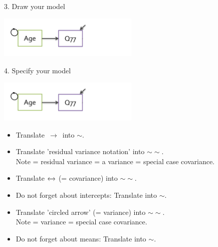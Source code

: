 \documentclass[10pt]{beamer}\usepackage[]{graphicx}\usepackage[]{xcolor}
\begin{document}
%
\begin{frame}[fragile]{3. Draw your model}

\includegraphics[height=2cm, keepaspectratio=T] {RegressionModel.png}

\end{frame}
%
\begin{frame}[fragile]{4. Specify your model}

\includegraphics[height=2cm, keepaspectratio=T] {RegressionModel.png}

\begin{itemize}
  \item Translate $\,\to\,$ into $\sim$.
  \item Translate 'residual variance notation' into $\sim\sim$.\\
  Note = residual variance = a variance = special case covariance.
  \item Translate $\xleftrightarrow{}$ (= covariance) into $\sim\sim$.
  \item Do not forget about intercepts: Translate into $\sim$.
  
  \vspace{5mm}
  
  \item Translate 'circled arrow' (= variance) into $\sim\sim$.\\
  Note = variance = special case covariance.
  \item Do not forget about means: Translate into $\sim$.
\end{itemize}
    
\end{frame}
%
\end{document}
